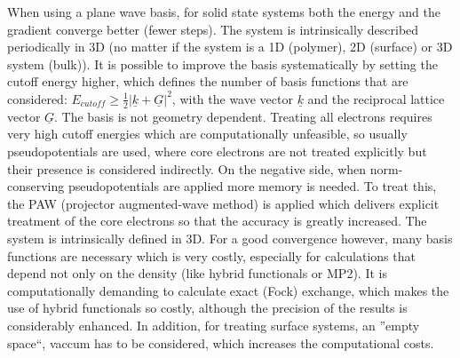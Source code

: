 \documentclass[11pt,DIV=13,BCOR=5mm,a4paper,headinclude]{scrbook}
\renewcommand{\vec}[1]{\underline{#1}}
\begin{document}
When using a plane wave basis, for solid state systems both the energy and the gradient converge better (fewer steps).
The system is intrinsically described periodically in 3D (no matter if the system is a 1D (polymer), 2D (surface) or 3D system (bulk)).
It is possible to improve the basis systematically by setting the cutoff energy higher, which defines the number of basis functions that are considered: $E_{cutoff}\geq \frac{1}{2}|\vec{k}+\vec{G}|^2$, with the wave vector $\vec{k}$ and the reciprocal lattice vector $\vec{G}$.
The basis is not geometry dependent.
Treating all electrons requires very high cutoff energies  which are computationally unfeasible, so usually pseudopotentials are used, where core electrons are not treated explicitly but their presence is considered indirectly.
On the negative side, when norm-conserving pseudopotentials are applied more memory is needed.
To treat this, the PAW (projector augmented-wave method)\cite{paw1,Kresse1999} is applied which delivers explicit treatment of the core electrons so that the accuracy is greatly increased.
The system is intrinsically defined in 3D.
For a good convergence however, many basis functions are necessary which is very costly, especially for calculations that depend not only on the density (like hybrid functionals or MP2).
It is computationally demanding to calculate exact (Fock) exchange, which makes the use of hybrid functionals so costly, although the precision of the results is considerably enhanced.
In addition, for treating surface systems, an ''empty space``, vaccum has to be considered, which increases the computational costs.
\\
\end{document}
